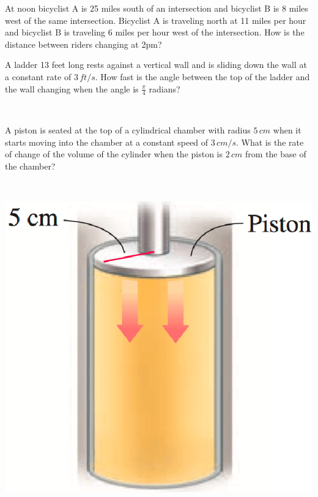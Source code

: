 \documentclass[mathNotesPreamble]{subfiles}
\begin{document}
\begin{ex*}
  At noon bicyclist A is 25 miles south of an intersection and bicyclist B is 8 miles west of the same intersection. Bicyclist A is traveling north at 11 miles per hour and bicyclist B is traveling 6 miles per hour west of the intersection. How is the distance between riders changing at 2pm?
\end{ex*}
\pagebreak

\begin{ex*}
  A ladder 13 feet long rests against a vertical wall and is sliding down the wall at a constant rate of $3\,ft/s$. How fast is the angle between the top of the ladder and the wall changing when the angle is $\frac{\pi}{4}$ radians?
\end{ex*}
\pagebreak

\noindent
\begin{minipage}[t]{0.7\linewidth}~
  \begin{ex*}
    A piston is seated at the top of a cylindrical chamber with radius $5\,cm$ when it starts moving into the chamber at a constant speed of $3\,cm/s$. What is the rate of change of the volume of the cylinder when the piston is $2\,cm$ from the base of the chamber?
  \end{ex*}
\end{minipage}%
\begin{minipage}[t]{0.3\linewidth}~
  \begin{flushright}
    \includegraphics[width=0.9\linewidth]{images/briggs_03_11/piston.png}
  \end{flushright}
\end{minipage}
\pagebreak
\end{document}
